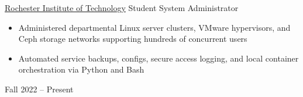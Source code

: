 \cvexperience
        {\href{https://www.rit.edu/}{Rochester Institute of Technology}}
        {Student System Administrator}
        {
                \begin{itemize}
                        \item Administered departmental Linux server clusters, VMware hypervisors, and Ceph storage networks supporting hundreds of concurrent users
                        \item Automated service backups, configs, secure access logging, and local container orchestration via Python and Bash
                \end{itemize}
        }
        {Fall 2022 -- Present}
        {    }
